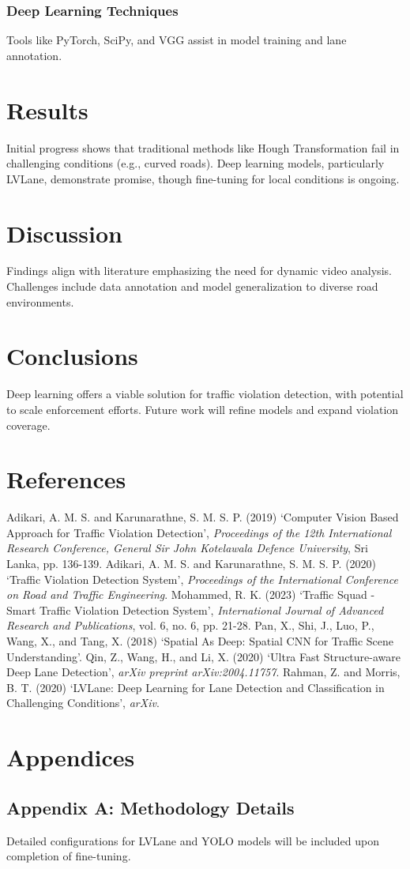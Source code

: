 \documentclass[12pt,a4paper]{article}
\begin{document}
\subsubsection{Deep Learning Techniques}
Tools like PyTorch, SciPy, and VGG assist in model training and lane annotation.

\section{Results}
Initial progress shows that traditional methods like Hough Transformation fail in challenging conditions (e.g., curved roads). Deep learning models, particularly LVLane, demonstrate promise, though fine-tuning for local conditions is ongoing.

\section{Discussion}
Findings align with literature emphasizing the need for dynamic video analysis. Challenges include data annotation and model generalization to diverse road environments.

\section{Conclusions}
Deep learning offers a viable solution for traffic violation detection, with potential to scale enforcement efforts. Future work will refine models and expand violation coverage.

\newpage
\section*{References}
\begin{thebibliography}{9}
 Adikari, A. M. S. and Karunarathne, S. M. S. P. (2019) `Computer Vision Based Approach for Traffic Violation Detection', \textit{Proceedings of the 12th International Research Conference, General Sir John Kotelawala Defence University}, Sri Lanka, pp. 136-139.
 Adikari, A. M. S. and Karunarathne, S. M. S. P. (2020) `Traffic Violation Detection System', \textit{Proceedings of the International Conference on Road and Traffic Engineering}.
 Mohammed, R. K. (2023) `Traffic Squad - Smart Traffic Violation Detection System', \textit{International Journal of Advanced Research and Publications}, vol. 6, no. 6, pp. 21-28.
 Pan, X., Shi, J., Luo, P., Wang, X., and Tang, X. (2018) `Spatial As Deep: Spatial CNN for Traffic Scene Understanding'.
 Qin, Z., Wang, H., and Li, X. (2020) `Ultra Fast Structure-aware Deep Lane Detection', \textit{arXiv preprint arXiv:2004.11757}.
 Rahman, Z. and Morris, B. T. (2020) `LVLane: Deep Learning for Lane Detection and Classification in Challenging Conditions', \textit{arXiv}.
\end{thebibliography}

\newpage
\section*{Appendices}
\subsection*{Appendix A: Methodology Details}
Detailed configurations for LVLane and YOLO models will be included upon completion of fine-tuning.
\end{document}
